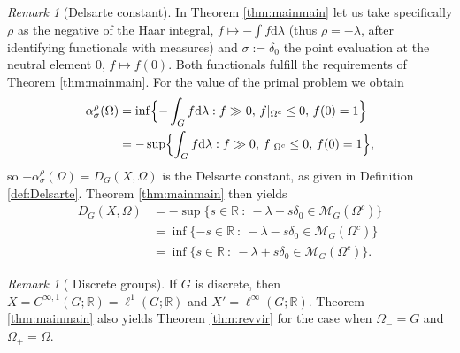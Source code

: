 \documentclass[[a4paper,english,12pt]{amsart}
\theoremstyle{plain}
\theoremstyle{remark}
\newtheorem{remark}[theorem]{Remark}
\newcommand{\MM}{\mathcal{M}}
\newcommand{\RR}{\mathbb R}
\def\dd{\mathrm{d}}
\def\haar{\lambda}
\newcommand{\si}{\sigma}
\newcommand{\rh}{\rho}
\begin{document}
\begin{remark}[Delsarte constant]
In Theorem \ref{thm:mainmain} let us take specifically $\rh$ as the negative of the Haar integral, $f\mapsto -\int f \dd\haar$ (thus $\rh=-\haar$, after identifying  functionals with measures) and $\si:=\delta_0$ the point evaluation at the neutral element $0$, $f\mapsto f(0)$. Both functionals fulfill the requirements of Theorem \ref{thm:mainmain}. For the value of the primal problem we obtain
\begin{align*}
\alpha^\rh_\si(\Omega) &=\inf\Bigl\{-\int_G f\dd\haar:f\gg 0,\, f|_{\Omega^c}\leq 0,\, f(0)=1\Bigr\}\\
&=-\sup\Bigl\{\int_G f\dd\haar:f\gg 0,\,f|_{\Omega^c}\leq 0 ,\,f(0)=1\Bigr\},
\end{align*}
so $-\alpha^\rh_\si(\Omega)= D_G(X,\Omega)$ is the Delsarte constant, as given in  Definition \ref{def:Delsarte}.  Theorem \ref{thm:mainmain} then yields
\begin{align*}
D_G(X,\Omega)&=- \sup \{ s \in \RR ~:~-\haar- s \delta_0  \in \MM_G(\Omega^c) \}\\
&=\inf \{- s \in \RR ~:~-\haar- s \delta_0  \in \MM_G(\Omega^c) \}\\
&=\inf \{s \in \RR ~:~-\haar+s \delta_0  \in \MM_G(\Omega^c) \}.
\end{align*}
\end{remark}
\begin{remark}[ Discrete groups]
If $G$ is discrete, then $X=C^{\infty,1}(G;\RR)=\ell^1(G;\RR)$ and $X'=\ell^\infty(G;\RR)$. Theorem \ref{thm:mainmain}  also yields  Theorem \ref{thm:revvir} for the case when $\Omega_-=G$ and $\Omega_+=\Omega$.
\end{remark}
\end{document}
